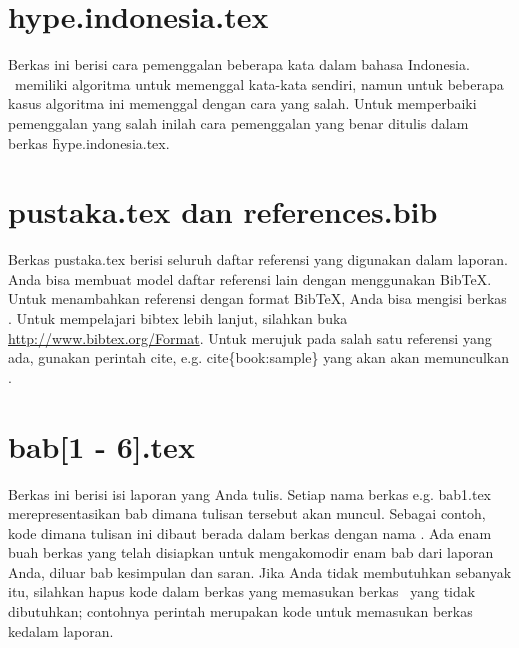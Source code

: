 \section{hype.indonesia.tex}
\label{sec:hype-indonesia-tex}
Berkas ini berisi cara pemenggalan beberapa kata dalam bahasa Indonesia. 
\latex~memiliki algoritma untuk memenggal kata-kata sendiri, namun untuk beberapa kasus algoritma ini memenggal dengan cara yang salah. 
Untuk memperbaiki pemenggalan yang salah inilah cara pemenggalan yang benar ditulis dalam berkas \f{hype.indonesia.tex}.


\section{pustaka.tex dan references.bib}
\label{sec:pustaka-tex}
Berkas pustaka.tex berisi seluruh daftar referensi yang digunakan dalam 
laporan. 
Anda bisa membuat model daftar referensi lain dengan menggunakan BibTeX. Untuk menambahkan referensi dengan format BibTeX, Anda bisa mengisi berkas .
Untuk mempelajari bibtex lebih lanjut, silahkan buka \url{http://www.bibtex.org/Format}. 
Untuk merujuk pada salah satu referensi yang ada, gunakan perintah \bslash cite, e.g. \bslash cite\{book:sample\} yang akan akan memunculkan \cite{book:sample}.


\section{bab[1 - 6].tex}
\label{sec:bab-tex}
Berkas ini berisi isi laporan yang Anda tulis. 
Setiap nama berkas e.g. bab1.tex merepresentasikan bab dimana tulisan tersebut akan muncul. 
Sebagai contoh, kode dimana tulisan ini dibaut berada dalam berkas dengan nama . 
Ada enam buah berkas yang telah disiapkan untuk mengakomodir enam bab dari laporan Anda, diluar bab kesimpulan dan saran. 
Jika Anda tidak membutuhkan sebanyak itu, silahkan hapus kode dalam berkas  yang memasukan berkas \latex~yang tidak dibutuhkan; contohnya perintah  merupakan kode untuk memasukan berkas  kedalam laporan.

